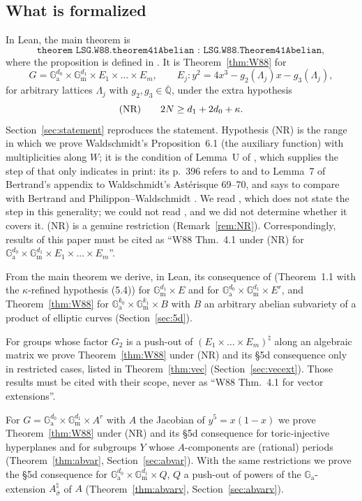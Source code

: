 \documentclass[11pt]{amsart}
\theoremstyle{definition}
\theoremstyle{remark}
\numberwithin{equation}{section}
\newcommand{\Qbar}{\overline{\mathbb{Q}}}
\newcommand{\Ga}{\mathbb{G}_{\mathrm{a}}}
\newcommand{\Gm}{\mathbb{G}_{\mathrm{m}}}
\newcommand{\NR}{\textup{(NR)}}
\begin{document}
\subsection{What is formalized}
In Lean, the main theorem is
\[
\texttt{theorem LSG.W88.theorem41Abelian : LSG.W88.Theorem41Abelian},
\]
where the proposition  is defined in . It is
Theorem~\ref{thm:W88} for
\[
G=\Ga^{d_0}\times\Gm^{d_1}\times E_1\times\dots\times E_m,\qquad E_j\colon y^2=4x^3-g_2(\Lambda_j)x-g_3(\Lambda_j),
\]
for arbitrary lattices $\Lambda_j$ with $g_2,g_3\in\Qbar$, under the extra hypothesis
\begin{equation}\label{eq:NR}
\NR\qquad 2N\ge d_1+2d_0+\kappa .
\end{equation}
Section~\ref{sec:statement} reproduces the statement. Hypothesis \NR{} is the range in which we prove
Waldschmidt's Proposition~6.1 (the auxiliary function) with multiplicities along $W$; it is the
condition of Lemma~U of \cite{RPaper}, which supplies the step of \cite[Prop.~6.1]{W88} that \cite{W88}
only indicates in print: its p.~396 refers to \cite{W83} and to Lemma~7 of Bertrand's appendix to Waldschmidt's Ast\'erisque 69--70, and says to compare
with Bertrand \cite{Be85} and Philippon--Waldschmidt \cite{PW88}. We read \cite{PW88}, which does not state the step in this generality; we could not read
\cite{Be85}, and we did not determine whether it covers it. \NR{} is a genuine restriction (Remark~\ref{rem:NR}). Correspondingly,
results of this paper must be cited as ``W88 Thm.~4.1 under \NR{} for
$\Ga^{d_0}\times\Gm^{d_1}\times E_1\times\dots\times E_m$''.

From the main theorem we derive, in Lean, its consequence of \cite[\S5d]{W88} (Theorem~1.1 with the
$\kappa$-refined hypothesis (5.4)) for $\Gm^{d_1}\times E$ and for $\Ga^{d_0}\times\Gm^{d_1}\times E^r$,
and Theorem~\ref{thm:W88} for $\Ga^{k_0}\times\Gm^{k_1}\times B$ with $B$ an arbitrary abelian
subvariety of a product of elliptic curves (Section~\ref{sec:5d}).

For groups whose factor $G_2$ is a push-out of $(E_1\times\dots\times E_m)^\natural$ along an algebraic
matrix we prove Theorem~\ref{thm:W88} under \NR{} and its \S5d consequence only in restricted cases,
listed in Theorem~\ref{thm:vec} (Section~\ref{sec:vecext}). Those results must be cited with their
scope, never as ``W88 Thm.~4.1 for vector extensions''.

For $G=\Ga^{d_0}\times\Gm^{d_1}\times A^r$ with $A$ the Jacobian of $y^5=x(1-x)$ we prove
Theorem~\ref{thm:W88} under \NR{} and its \S5d consequence for toric-injective hyperplanes and for subgroups
$Y$ whose $A$-components are (rational) periods (Theorem~\ref{thm:abvar}, Section~\ref{sec:abvar}). With the same
restrictions we prove the \S5d consequence for $\Ga^{d_0}\times\Gm^{d_1}\times Q$, $Q$ a push-out of powers of the
$\Ga$-extension $A_{\bar\sigma}^\natural$ of $A$ (Theorem~\ref{thm:abvarv}, Section~\ref{sec:abvarv}).
\end{document}
